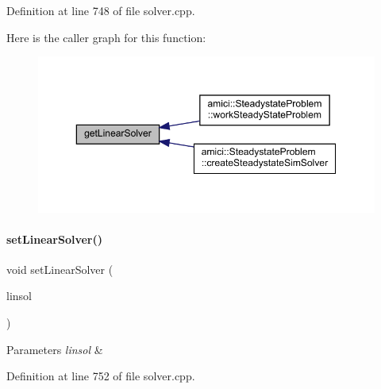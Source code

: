 Definition at line 748 of file solver.\+cpp.

Here is the caller graph for this function\+:
\nopagebreak
\begin{figure}[H]
\begin{center}
\leavevmode
\includegraphics[width=350pt]{classamici_1_1_solver_aa5cde2d316aae1d60d6eaf94ce7a854f_icgraph}
\end{center}
\end{figure}
\mbox{\label{classamici_1_1_solver_acc8ecf11ad5a8480dd02f757faa264b2}} 
\paragraph{\texorpdfstring{set\+Linear\+Solver()}{setLinearSolver()}}
{\footnotesize\ttfamily void set\+Linear\+Solver (\begin{DoxyParamCaption}\item[{\mbox{\hyperlink{namespaceamici_a1a6a4776314a0843143e5631c3ce21a7}{Linear\+Solver}}}]{linsol }\end{DoxyParamCaption})}


\begin{DoxyParams}{Parameters}
{\em linsol} & \\
\hline
\end{DoxyParams}


Definition at line 752 of file solver.\+cpp.

